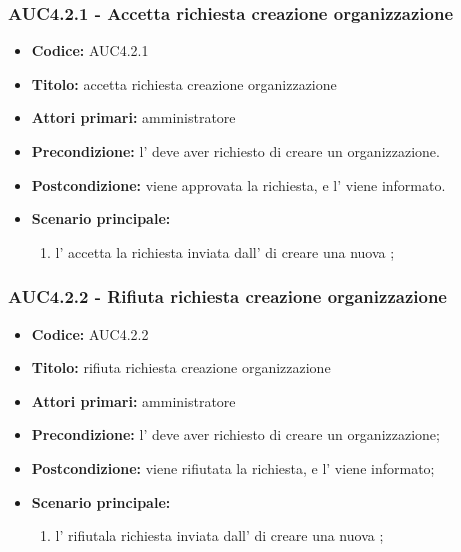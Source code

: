 \documentclass[casi-duso]{subfiles}
\begin{document}
\subsubsection{AUC4.2.1 - Accetta richiesta creazione organizzazione}
\label{subsub:AUC4.2.1}
\begin{itemize}
  \item \textbf{Codice:} AUC4.2.1
  \item \textbf{Titolo:} accetta richiesta creazione organizzazione
  \item \textbf{Attori primari:} amministratore
  \item \textbf{Precondizione:} l' deve aver richiesto di creare un organizzazione.
  \item \textbf{Postcondizione:} viene approvata la richiesta, e l' viene informato.
  \item \textbf{Scenario principale:} 
  \begin{enumerate}
    \item  l' accetta la richiesta inviata dall' di creare una nuova ;
  \end{enumerate}
\end{itemize}

\subsubsection{AUC4.2.2 - Rifiuta richiesta creazione organizzazione}
\label{subsub:AUC4.2.2}
\begin{itemize}
  \item \textbf{Codice:} AUC4.2.2
  \item \textbf{Titolo:} rifiuta richiesta creazione organizzazione
  \item \textbf{Attori primari:} amministratore
  \item \textbf{Precondizione:} l' deve aver richiesto di creare un organizzazione;
  \item \textbf{Postcondizione:} viene rifiutata la richiesta, e l' viene informato;
  \item \textbf{Scenario principale:} 
  \begin{enumerate}
    \item  l' rifiutala richiesta inviata dall' di creare una nuova ;
  \end{enumerate}
\end{itemize}
\end{document}
